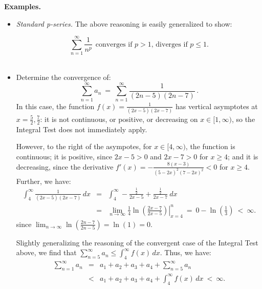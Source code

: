 \documentclass[11pt]{article}
\begin{document}
{\bf Examples.} \begin{itemize}

\item {\it Standard p-series.} 
The above reasoning is easily generalized to show:

$$\boxed{
\ \sum_{n=1}^\infty \frac1{n^p}
\ \ \text{converges if $p>1$, diverges if $p\leq1$.}\ 
}$$
\\[-1.5em]

\item  Determine the convergence of:
$$
\sum\limits_{n=1}^\infty a_n \ =\ \sum\limits_{n=1}^\infty \frac1{(2n-5)(2n-7)}\,. 
$$
In this case, the function $f(x)=\frac1{(2x-5)(2x-7)}$
has vertical asymptotes at $x=\frac52,\frac72$:
it is not continuous, or positive, or decreasing on $x\in[1,\infty)$,
so the Integral Test does not immediately apply.

However, to the right of the asympotes, for $x\in[4,\infty)$,
the function is continuous; it is positive, 
since $2x-5>0$ and $2x-7>0$ for $x\geq 4$;
and it is decreasing, since the derivative
$f'(x) =  -\frac{8 (x-3)}{(5-2 x)^2 (7-2 x)^2} < 0$
for $x\geq 4$. Further, we have:
$$\begin{array}{rcl}
\int_4^\infty \frac1{(2x-5)(2x-7)}\, dx
&=&
\int_4^\infty\!\! -\frac{\frac12}{2 x-5} +  \frac{\frac12}{2 x-7}\  dx
\\[1em]
&=& 
\lim_{n\to\infty}
\left.
\tfrac14 \ln\!\left(\frac{2x{-}7}{2x{-}5}\right)
\right|_{x=4}^n
\ =\
0 - \ln(\frac13) \ < \ \infty.
\end{array}$$
since $\lim_{n\to\infty} \ln\!\left(\frac{2n{-}7}{2n{-}5}\right)
=\ln(1)=0$.

Slightly generalizing the reasoning of the convergent case of the Integral Test above,
we find that $\sum\limits_{n=5}^\infty a_n \leq \int_4^\infty f(x)\,dx$.
Thus, we have:
$$\begin{array}{rcl}
\sum\limits_{n=1}^\infty a_n
&=&
a_1+a_2+a_3+a_4+ \sum\limits_{n=5}^\infty a_n
\\[1.5em]
&<& a_1+a_2+a_3+a_4+ \int_4^\infty f(x)\,dx \ <\ \infty.
\end{array}$$

\end{itemize}
\end{document}
